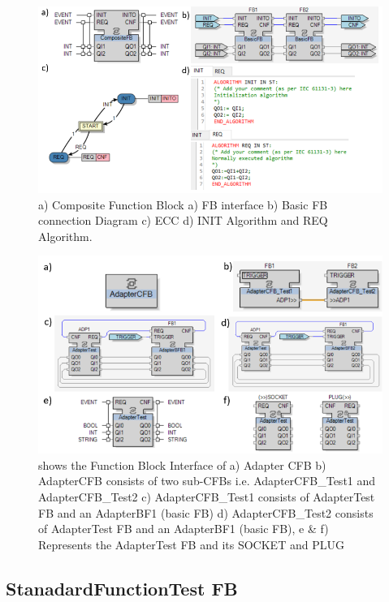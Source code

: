 \documentclass[conference]{IEEEtran}
\begin{document}
\begin{figure}[!b]
    \centering
    \includegraphics[width=\columnwidth]{Figures/CFBTest.PNG}
    \caption{a) Composite Function Block a) FB interface b) Basic FB connection Diagram c) ECC d) INIT Algorithm and REQ Algorithm.} 
    \label{fig:CFBTest}
\end{figure}

\begin{figure}[!b]
    \centering
    \includegraphics[width=\columnwidth]{Figures/AdapterCFB.PNG}
    \caption{ shows the Function Block Interface of a) Adapter CFB b) AdapterCFB consists of two sub-CFBs i.e. AdapterCFB\_Test1 and AdapterCFB\_Test2 c) AdapterCFB\_Test1 consists of AdapterTest FB and an AdapterBF1 (basic FB) d)  AdapterCFB\_Test2 consists of AdapterTest FB and an AdapterBF1 (basic FB), e \& f) Represents the  AdapterTest FB  and its SOCKET and PLUG } 
    \label{fig:AdapterCFB}
\end{figure}

\subsection{StanadardFunctionTest FB}
\end{document}
